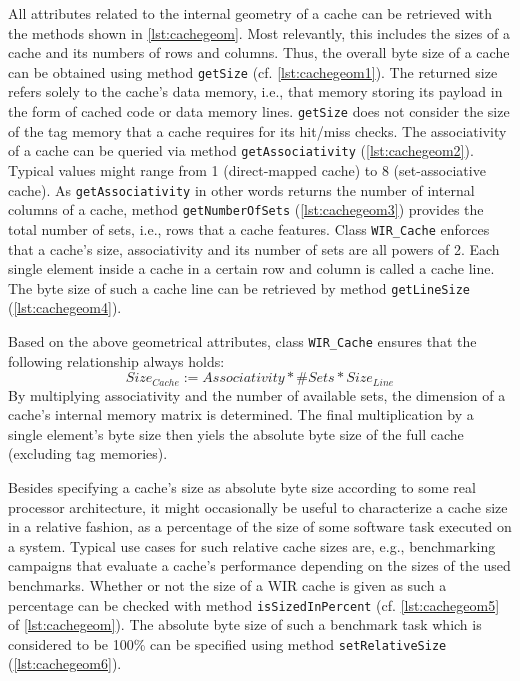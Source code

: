 All attributes related to the internal geometry of a cache can be retrieved with the methods shown in \cref{lst:cachegeom}.
Most relevantly, this includes the sizes of a cache and its numbers of rows and columns.
Thus, the overall byte size of a cache can be obtained using method \texttt{getSize} (cf. \cref{lst:cachegeom1}).
The returned size refers solely to the cache's data memory, i.e., that memory storing its payload in the form of cached code or data memory lines.
\texttt{getSize} does not consider the size of the tag memory that a cache requires for its hit/miss checks.
The associativity of a cache can be queried via method \texttt{getAssociativity} (\cref{lst:cachegeom2}).
Typical values might range from 1 (direct-mapped cache) to 8 (set-associative cache).
As \texttt{getAssociativity} in other words returns the number of internal columns of a cache, method \texttt{getNumberOfSets} (\cref{lst:cachegeom3}) provides the total number of sets, i.e., rows that a cache features.
Class \texttt{WIR\_Cache} enforces that a cache's size, associativity and its number of sets are all powers of 2.
Each single element inside a cache in a certain row and column is called a cache line.
The byte size of such a cache line can be retrieved by method \texttt{getLineSize} (\cref{lst:cachegeom4}).

Based on the above geometrical attributes, class \texttt{WIR\_Cache} ensures that the following relationship always holds:
\begin{displaymath}
  \mathit{Size}_\mathit{Cache} := \mathit{Associativity} \ast \mathit{\#Sets} \ast \mathit{Size}_\mathit{Line}
\end{displaymath}
By multiplying associativity and the number of available sets, the dimension of a cache's internal memory matrix is determined.
The final multiplication by a single element's byte size then yiels the absolute byte size of the full cache (excluding tag memories).

Besides specifying a cache's size as absolute byte size according to some real processor architecture, it might occasionally be useful to characterize a cache size in a relative fashion, as a percentage of the size of some software task executed on a system.
Typical use cases for such relative cache sizes are, e.g., benchmarking campaigns that evaluate a cache's performance depending on the sizes of the used benchmarks.
Whether or not the size of a \gls{WIR} cache is given as such a percentage can be checked with method \texttt{isSizedInPercent} (cf. \cref{lst:cachegeom5} of \cref{lst:cachegeom}).
The absolute byte size of such a benchmark task which is considered to be 100\% can be specified using method \texttt{setRelativeSize} (\cref{lst:cachegeom6}).

